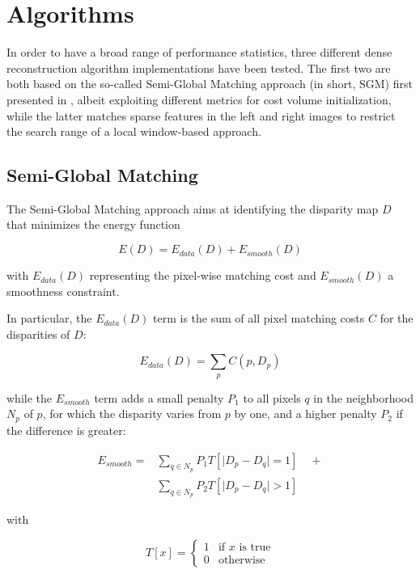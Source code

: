 \section{Algorithms}\label{ch:chapter03_03}

In order to have a broad range of performance statistics, three different dense reconstruction algorithm implementations have been tested. The first two are both based on the so-called Semi-Global Matching approach (in short, SGM) first presented in \cite{Hirschmuller2005}, albeit exploiting different metrics for cost volume initialization, while the latter \citep{Geiger2011} matches sparse features in the left and right images to restrict the search range of a local window-based approach.

\subsection{Semi-Global Matching}\label{ch:chapter03_03_01}

The Semi-Global Matching approach aims at identifying the disparity map $D$ that minimizes the energy function

\begin{equation}\label{eq:cp03_SGM_energy}
E(D) = E_{data}(D) + E_{smooth}(D)
\end{equation}

with $E_{data}(D)$ representing the pixel-wise matching cost and $E_{smooth}(D)$ a smoothness constraint.

In particular, the $E_{data}(D)$ term is the sum of all pixel matching costs $C$ for the disparities of $D$:

\begin{equation}\label{eq:cp03_SGM_energy_data}
E_{data}(D) = \sum_p C(p, D_p)
\end{equation}

while the $E_{smooth}$ term adds a small penalty $P_1$ to all pixels $q$ in the neighborhood $N_p$ of $p$, for which the disparity varies from $p$ by one, and a higher penalty $P_2$ if the difference is greater:

\begin{align}\label{eq:cp03_SGM_energy_smooth}
  E_{smooth} = & \sum_{q \in N_p} P_1 T[\lvert D_p - D_q \rvert = 1] \quad + \nonumber \\
	       & \sum_{q \in N_p} P_2 T[\lvert D_p - D_q \rvert > 1]
\end{align}

with

\begin{equation}\label{eq:cp03_SGM_energy_smooth_T}
 T[x] = \left\{ \begin{array}{ll}
         1 & \mbox{if $x$ is true}\\
         0 & \mbox{otherwise}
         \end{array} \right.
\end{equation}

